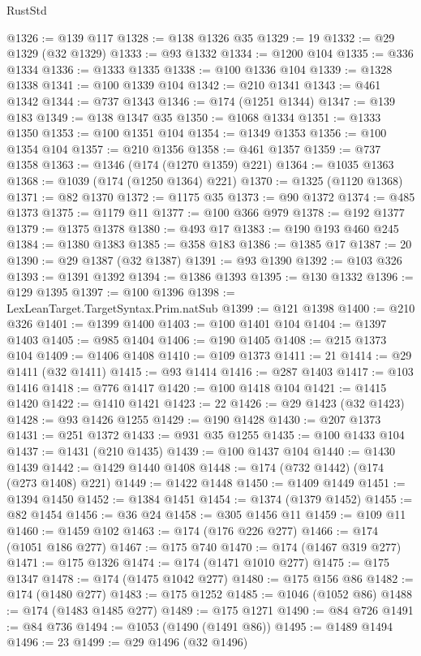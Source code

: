 \begin{lexlean}{RustStd}
\begin{coremodule}
@1326 := @139 @117
@1328 := @138 @1326 @35
@1329 := 19
@1332 := @29 @1329 (@32 @1329)
@1333 := @93 @1332
@1334 := @1200 @104
@1335 := @336 @1334
@1336 := @1333 @1335
@1338 := @100 @1336 @104
@1339 := @1328 @1338
@1341 := @100 @1339 @104
@1342 := @210 @1341
@1343 := @461 @1342
@1344 := @737 @1343
@1346 := @174 (@1251 @1344)
@1347 := @139 @183
@1349 := @138 @1347 @35
@1350 := @1068 @1334
@1351 := @1333 @1350
@1353 := @100 @1351 @104
@1354 := @1349 @1353
@1356 := @100 @1354 @104
@1357 := @210 @1356
@1358 := @461 @1357
@1359 := @737 @1358
@1363 := @1346 (@174 (@1270 @1359) @221)
@1364 := @1035 @1363
@1368 := @1039 (@174 (@1250 @1364) @221)
@1370 := @1325 (@1120 @1368)
@1371 := @82 @1370
@1372 := @1175 @35
@1373 := @90 @1372
@1374 := @485 @1373
@1375 := @1179 @11
@1377 := @100 @366 @979
@1378 := @192 @1377
@1379 := @1375 @1378
@1380 := @493 @17
@1383 := @190 @193 @460 @245
@1384 := @1380 @1383
@1385 := @358 @183
@1386 := @1385 @17
@1387 := 20
@1390 := @29 @1387 (@32 @1387)
@1391 := @93 @1390
@1392 := @103 @326
@1393 := @1391 @1392
@1394 := @1386 @1393
@1395 := @130 @1332
@1396 := @129 @1395
@1397 := @100 @1396
@1398 := LexLeanTarget.TargetSyntax.Prim.natSub
@1399 := @121 @1398
@1400 := @210 @326
@1401 := @1399 @1400
@1403 := @100 @1401 @104
@1404 := @1397 @1403
@1405 := @985 @1404
@1406 := @190 @1405
@1408 := @215 @1373 @104
@1409 := @1406 @1408
@1410 := @109 @1373
@1411 := 21
@1414 := @29 @1411 (@32 @1411)
@1415 := @93 @1414
@1416 := @287 @1403
@1417 := @103 @1416
@1418 := @776 @1417
@1420 := @100 @1418 @104
@1421 := @1415 @1420
@1422 := @1410 @1421
@1423 := 22
@1426 := @29 @1423 (@32 @1423)
@1428 := @93 @1426 @1255
@1429 := @190 @1428
@1430 := @207 @1373
@1431 := @251 @1372
@1433 := @931 @35 @1255
@1435 := @100 @1433 @104
@1437 := @1431 (@210 @1435)
@1439 := @100 @1437 @104
@1440 := @1430 @1439
@1442 := @1429 @1440 @1408
@1448 := @174 (@732 @1442) (@174 (@273 @1408) @221)
@1449 := @1422 @1448
@1450 := @1409 @1449
@1451 := @1394 @1450
@1452 := @1384 @1451
@1454 := @1374 (@1379 @1452)
@1455 := @82 @1454
@1456 := @36 @24
@1458 := @305 @1456 @11
@1459 := @109 @11
@1460 := @1459 @102
@1463 := @174 (@176 @226 @277)
@1466 := @174 (@1051 @186 @277)
@1467 := @175 @740
@1470 := @174 (@1467 @319 @277)
@1471 := @175 @1326
@1474 := @174 (@1471 @1010 @277)
@1475 := @175 @1347
@1478 := @174 (@1475 @1042 @277)
@1480 := @175 @156 @86
@1482 := @174 (@1480 @277)
@1483 := @175 @1252
@1485 := @1046 (@1052 @86)
@1488 := @174 (@1483 @1485 @277)
@1489 := @175 @1271
@1490 := @84 @726
@1491 := @84 @736
@1494 := @1053 (@1490 (@1491 @86))
@1495 := @1489 @1494
@1496 := 23
@1499 := @29 @1496 (@32 @1496)

\end{coremodule}
\end{lexlean}
